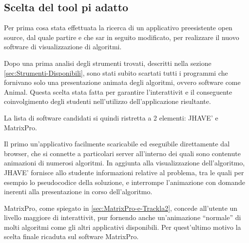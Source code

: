 \subsection{Scelta del tool pi adatto}

Per prima cosa  stata effettuata la ricerca di un applicativo preesistente
open source, dal quale partire e che sar in seguito modificato, per
realizzare il nuovo software di visualizzazione di algoritmi.

Dopo una prima analisi degli strumenti trovati, descritti nella sezione
\ref{sec:Strumenti-Disponibili}, sono stati subito scartati tutti
i programmi che fornivano solo una presentazione animata degli algoritmi,
ovvero software come Animal. Questa scelta  stata fatta per garantire
l'interattivit e il conseguente coinvolgimento degli studenti nell'utilizzo
dell'applicazione risultante.

La lista di software candidati si  quindi ristretta a 2 elementi:
JHAVE' e MatrixPro.

Il primo  un'applicativo facilmente scaricabile ed eseguibile direttamente
dal browser, che si connette a particolari server all'interno dei
quali sono contenute animazioni di numerosi algoritmi. In aggiunta
alla visualizzazione dell'algoritmo, JHAVE' fornisce allo studente
informazioni relative al problema, tra le quali per esempio lo pseudocodice
della soluzione, e interrompe l'animazione con domande inerenti alla
presentazione in corso dell'algoritmo.

MatrixPro, come spiegato in \ref{sec:MatrixPro-e-Trackla2}, concede
all'utente un livello maggiore di interattivit, pur fornendo anche
un'animazione {}``normale'' di molti algoritmi come gli altri applicativi
disponibili. Per quest'ultimo motivo la scelta finale  ricaduta sul
software MatrixPro.

